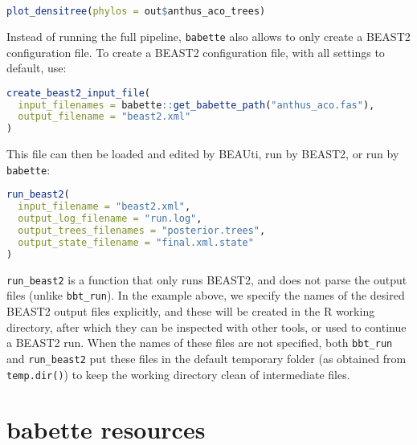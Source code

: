 \begin{lstlisting}[language=R, floatplacement=H]
plot_densitree(phylos = out$anthus_aco_trees)
\end{lstlisting}
Instead of running the full pipeline, 
\verb;babette; also allows to only create a BEAST2 configuration file.
To create a BEAST2 configuration file, with all settings to default, use:

\begin{lstlisting}[language=R, floatplacement=H]
create_beast2_input_file(
  input_filenames = babette::get_babette_path("anthus_aco.fas"),
  output_filename = "beast2.xml"
)
\end{lstlisting}
This file can then be loaded and edited by BEAUti, 
run by BEAST2, or run by \verb;babette;: 

\begin{lstlisting}[language=R, floatplacement=H]
run_beast2(
  input_filename = "beast2.xml",
  output_log_filename = "run.log",
  output_trees_filenames = "posterior.trees",
  output_state_filename = "final.xml.state"
)
\end{lstlisting}
\verb;run_beast2; is a function that only runs BEAST2, 
and does not parse the output files (unlike \verb;bbt_run;). 
In the example above, 
we specify the names of the desired BEAST2 
output files explicitly, and these will be created in the
R working directory, after which they can be inspected 
with other tools, or used to continue a BEAST2 run.
When the names of these files are not specified, 
both \verb;bbt_run; and \verb;run_beast2;
put these files in the default temporary folder (as
obtained from \verb;temp.dir();) to keep
the working directory clean of intermediate files. 

\section{babette resources}

